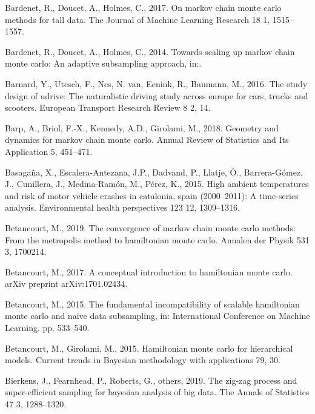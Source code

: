 \documentclass[12pt]{book}
\numberwithin{equation}{chapter}
\begin{document}
\leavevmode\hypertarget{ref-bardenet2017markov}{}%
Bardenet, R., Doucet, A., Holmes, C., 2017. On markov chain monte carlo methods for tall data. The Journal of Machine Learning Research 18 1, 1515--1557.

\leavevmode\hypertarget{ref-bardenet2014towards}{}%
Bardenet, R., Doucet, A., Holmes, C., 2014. Towards scaling up markov chain monte carlo: An adaptive subsampling approach, in:.

\leavevmode\hypertarget{ref-barnard2016study}{}%
Barnard, Y., Utesch, F., Nes, N. van, Eenink, R., Baumann, M., 2016. The study design of udrive: The naturalistic driving study across europe for cars, trucks and scooters. European Transport Research Review 8 2, 14.

\leavevmode\hypertarget{ref-barp2018geometry}{}%
Barp, A., Briol, F.-X., Kennedy, A.D., Girolami, M., 2018. Geometry and dynamics for markov chain monte carlo. Annual Review of Statistics and Its Application 5, 451--471.

\leavevmode\hypertarget{ref-basagana2015high}{}%
Basagaña, X., Escalera-Antezana, J.P., Dadvand, P., Llatje, Ò., Barrera-Gómez, J., Cunillera, J., Medina-Ramón, M., Pérez, K., 2015. High ambient temperatures and risk of motor vehicle crashes in catalonia, spain (2000--2011): A time-series analysis. Environmental health perspectives 123 12, 1309--1316.

\leavevmode\hypertarget{ref-betancourt2019convergence}{}%
Betancourt, M., 2019. The convergence of markov chain monte carlo methods: From the metropolis method to hamiltonian monte carlo. Annalen der Physik 531 3, 1700214.

\leavevmode\hypertarget{ref-betancourt2017conceptual}{}%
Betancourt, M., 2017. A conceptual introduction to hamiltonian monte carlo. arXiv preprint arXiv:1701.02434.

\leavevmode\hypertarget{ref-betancourt2015fundamental}{}%
Betancourt, M., 2015. The fundamental incompatibility of scalable hamiltonian monte carlo and naive data subsampling, in: International Conference on Machine Learning. pp. 533--540.

\leavevmode\hypertarget{ref-betancourt2015hamiltonian}{}%
Betancourt, M., Girolami, M., 2015. Hamiltonian monte carlo for hierarchical models. Current trends in Bayesian methodology with applications 79, 30.

\leavevmode\hypertarget{ref-bierkens2019zig}{}%
Bierkens, J., Fearnhead, P., Roberts, G., others, 2019. The zig-zag process and super-efficient sampling for bayesian analysis of big data. The Annals of Statistics 47 3, 1288--1320.
\end{document}
